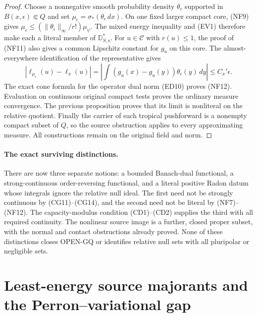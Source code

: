 \documentclass[11pt,a4paper]{article}
\numberwithin{equation}{section}
\theoremstyle{definition}
\theoremstyle{remark}
\begin{document}
\begin{proof}
Choose a nonnegative smooth probability density
$\theta_\epsilon$ supported in $B(x,\epsilon)\Subset Q$
and set $\mu_\epsilon=\sigma_*(\theta_\epsilon\,dx)$.
On one fixed larger compact core, (NF9) gives
$\mu_\epsilon\leq(\|\theta_\epsilon\|_\infty/r!)\mu_\psi$.
The mixed energy inequality and (EV1) therefore make
each a literal member of $\mathbb D_{S,\mathrm s}^*$.
For $u\in\mathscr C$ with $r(u)\leq1$, the proof of
(NF11) also gives a common Lipschitz constant for $g_u$
on this core. The almost-everywhere identification of the
representative gives
\[
 \left|\ell_{\mu_\epsilon}(u)-\ell_x(u)\right|
       =\left|\int(g_u(x)-g_u(y))\theta_\epsilon(y)\,dy\right|
       \leq C_x'\epsilon.
\]
The exact cone formula for the operator dual norm (ED10)
proves (NF12). Evaluation on continuous original compact
tests proves the ordinary measure convergence. The previous
proposition proves that its limit is nonliteral on the
relative quotient. Finally the carrier of each tropical
pushforward is a nonempty compact subset of $Q$, so the
source obstruction applies to every approximating measure.
All constructions remain on the original field and norm.
\end{proof}

\paragraph{The exact surviving distinctions.}
There are now three separate notions: a bounded Banach-dual
functional, a strong-continuous order-reversing functional,
and a literal positive Radon datum whose integrals ignore
the relative null ideal. The first need not be strongly
continuous by (CG11)--(CG14), and the second need not be
literal by (NF7)--(NF12). The capacity-modulus condition
(CD1)--(CD2) supplies the third with all required continuity.
The nonlinear source image is a further, closed proper subset,
with the normal and contact obstructions already proved.
None of these distinctions closes OPEN-GQ or identifies
relative null sets with all pluripolar or negligible sets.



\section{Least-energy source majorants and the Perron--variational gap}
\label{sec:r12-perron-variational-gap}
\end{document}
